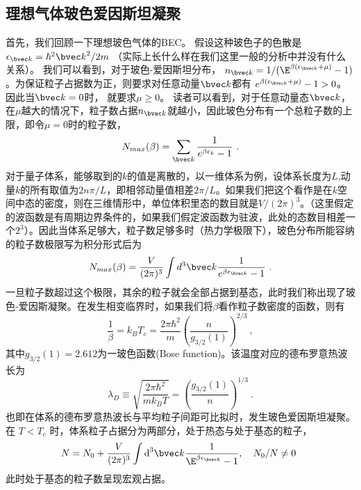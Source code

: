 
\subsection{理想气体玻色爱因斯坦凝聚}
首先，我们回顾一下理想玻色气体的BEC。 假设这种玻色子的色散是 $\epsilon_{\bvec k} = \hbar^2{\bvec k}^2/2m$ （实际上长什么样在我们这里一般的分析中并没有什么关系）。 我们可以看到，对于玻色-爱因斯坦分布， $n_{\bvec k}=1/(\E^{\beta(\epsilon_{\bvec k}+\mu)}-1)$。为保证粒子占据数为正，则要求对任意动量$\bvec k$都有 $e^{\beta (\epsilon_{\bvec k}+\mu)}-1>0$。 因此当$\bvec k = 0$时， 就要求$\mu \geq 0$。 读者可以看到，对于任意动量态$\bvec k$，在$\mu$越大的情况下，粒子数占据$n_{\bvec k}$就越小，因此玻色分布有一个总粒子数的上限，即令$\mu = 0$时的粒子数，
\begin{equation}
N_{max}(\beta) = \sum_{\bvec k} \frac{1}{e^{\beta \epsilon_k}-1}~.
\end{equation}
对于量子体系，能够取到的$k$的值是离散的，以一维体系为例，设体系长度为$L$,动量$k$的所有取值为$2 n\pi/L$，即相邻动量值相差$2\pi/L$。如果我们把这个看作是在$k$空间中态的密度，则在三维情形中，单位体积里态的数目就是$V/(2 \pi)^3$。（这里假定的波函数是有周期边界条件的，如果我们假定波函数为驻波，此处的态数目相差一个$2^3$）。因此当体系足够大，粒子数足够多时（热力学极限下），玻色分布所能容纳的粒子数极限写为积分形式后为
\begin{equation}
N_{max}(\beta) = \frac{V}{(2\pi)^3}\int d^3 \bvec k \frac{1}{e^{\beta \epsilon_{\bvec k}}-1}~.
\end{equation}
一旦粒子数超过这个极限，其余的粒子就会全部占据到基态，此时我们称出现了玻色-爱因斯凝聚。在发生相变临界时，如果我们将$\beta$看作粒子数密度的函数，则有
\begin{equation}
\frac{1}{\beta} = k_B T_c = \frac{2\pi \hbar^2}{m}(\frac{n}{g_{3/2}(1)})^{2/3}~,
\end{equation}
其中$g_{3/2}(1) = 2.612$为一玻色函数(Bose function)。该温度对应的德布罗意热波长为
\begin{equation}
\lambda_D \equiv \sqrt{\frac{2\pi \hbar^2}{m k_B T}} = (\frac{g_{3/2}(1)}{n})^{1/3}~.
\end{equation}
也即在体系的德布罗意热波长与平均粒子间距可比拟时，发生玻色爱因斯坦凝聚。 在 $T<T_c$ 时，体系粒子占据分为两部分，处于热态与处于基态的粒子，
\begin{equation}
N=N_0+\frac{V}{(2\pi)^3}\int \text{d}^3{\bvec k}\frac{1}{\E^{\beta\epsilon_{\bvec k}}-1},\quad N_0/N\neq0~
\end{equation}
此时处于基态的粒子数呈现宏观占据。
